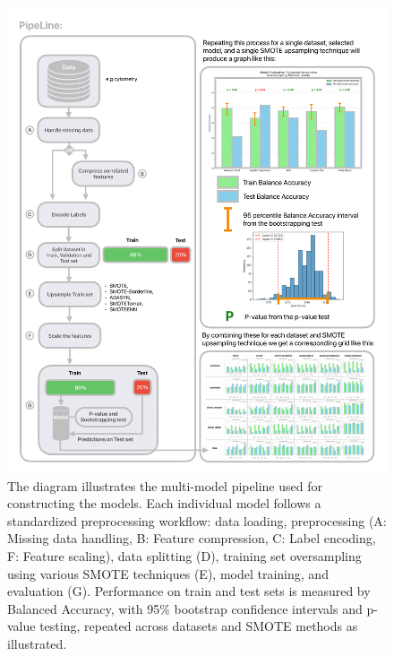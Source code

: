 \documentclass[12pt,a4paper]{report}
\begin{document}
\pagebreak
\begin{figure}[H]
  \centering
  \hspace*{-0.9cm} %
  \includegraphics[width=1.1\textwidth]{images/Pipeline-2.png} %
  \caption[Feature Identification models pipeline diagram]{ The diagram illustrates the multi-model pipeline used for constructing the models.  Each individual model follows a standardized preprocessing workflow: data loading, preprocessing (A: Missing data handling, B: Feature compression, C: Label encoding, F: Feature scaling), data splitting (D), training set oversampling using various SMOTE techniques (E), model training, and evaluation (G). Performance on train and test sets is measured by Balanced Accuracy, with 95\% bootstrap confidence intervals and p-value testing, repeated across datasets and SMOTE methods as illustrated.}
  \label{fig:pipeline-2}
\end{figure}
\end{document}
